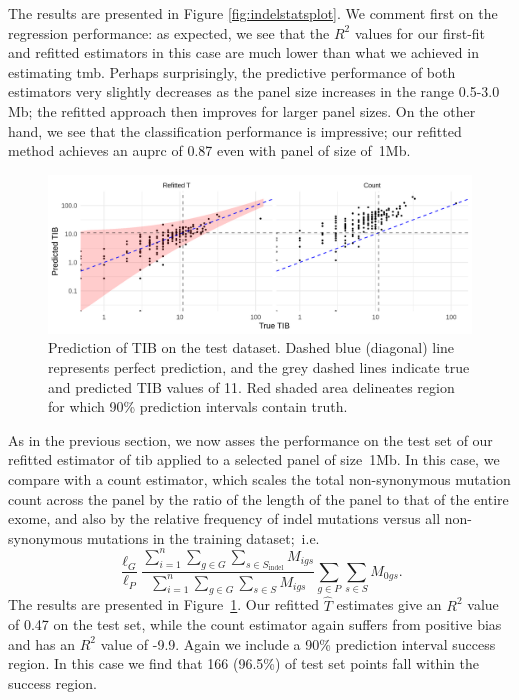 \documentclass[10pt,twoside,openright]{report}
\begin{document}
The results are presented in Figure \ref{fig:indelstatsplot}. We comment first on the regression performance: as expected, we see that the $R^2$ values for our first-fit and refitted estimators in this case are much lower than what we achieved in estimating \acrshort{tmb}. Perhaps surprisingly, the predictive performance of both estimators very slightly decreases as the panel size increases in the range 0.5-3.0 Mb; the refitted approach then improves for larger panel sizes. On the other hand, we see that the classification performance is impressive; our refitted method achieves an \acrshort{auprc} of 0.87 even with panel of size of~1Mb. 

\begin{figure}[htbp]
\centering
\includegraphics[width=6in]{indel_predictions_figure.png}
\vspace*{-5mm}
\caption{Prediction of TIB on the test dataset. Dashed blue (diagonal) line represents perfect prediction, and the grey dashed lines indicate true and predicted TIB values of 11. Red shaded area delineates region for which 90\% prediction intervals contain truth.
\label{fig:indel_predictions_figure}}
\vspace*{-2mm}
\end{figure} 

As in the previous section, we now asses the performance on the test set of our refitted estimator of \acrshort{tib} applied to a selected panel of size~1Mb.   %
In this case, we compare with a count estimator, which scales the total non-synonymous mutation count across the panel by the ratio of the length of the panel to that of the entire exome, and also by the relative frequency of indel mutations versus all non-synonymous mutations in the training dataset;~i.e. 
\[
\frac{\ell_G}{\ell_{P}} \frac{\sum_{i =1}^{n} \sum_{g \in G} \sum_{s \in S_{\text{indel}}} M_{igs}}{\sum_{i=1}^{n}\sum_{g \in G} \sum_{s \in S} M_{igs}}\sum_{g \in P} \sum_{s \in S} M_{0gs}.
\]
The results are presented in Figure~\ref{fig:indel_predictions_figure}. Our refitted $\hat{T}$ estimates give an $R^2$ value of 0.47 on the test set, while the count estimator again suffers from positive bias and has an $R^2$ value of -9.9. Again we include a 90\% prediction interval success region. In this case we find that 166 (96.5\%) of test set points fall within the success region.
\end{document}
